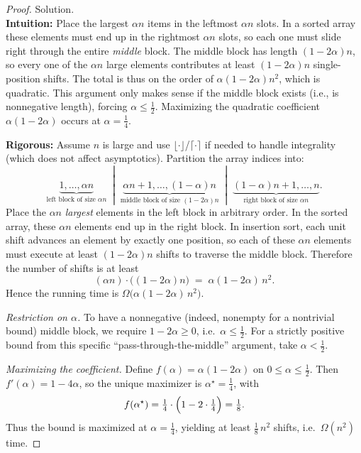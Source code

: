 \documentclass[12pt]{article}
\theoremstyle{definition}
\begin{document}
\begin{proof}
Solution. \\

\noindent
\textbf{Intuition:}  
Place the largest $\alpha n$ items in the leftmost $\alpha n$ slots. In a sorted array
these elements must end up in the rightmost $\alpha n$ slots, so each one must slide
right through the entire \emph{middle} block. The middle block has length
$(1-2\alpha)n$, so every one of the $\alpha n$ large elements contributes at least
$(1-2\alpha)n$ single-position shifts. The total is thus on the order of
$\alpha(1-2\alpha)n^2$, which is quadratic. This argument only makes sense if the
middle block exists (i.e., is nonnegative length), forcing $\alpha \le \tfrac12$.
Maximizing the quadratic coefficient $\alpha(1-2\alpha)$ occurs at $\alpha=\tfrac14$.

\noindent
\textbf{Rigorous:}  
Assume $n$ is large and use $\lfloor\cdot\rfloor$/$\lceil\cdot\rceil$ if needed to handle
integrality (which does not affect asymptotics). Partition the array indices into:
\[
\underbrace{1,\dots,\alpha n}_{\text{left block of size }\alpha n}\;\;|\;\;
\underbrace{\alpha n+1,\dots,(1-\alpha)n}_{\text{middle block of size }(1-2\alpha)n}\;\;|\;\;
\underbrace{(1-\alpha)n+1,\dots,n}_{\text{right block of size }\alpha n}.
\]
Place the $\alpha n$ \emph{largest} elements in the left block in arbitrary order. In
the sorted array, these $\alpha n$ elements end up in the right block. In insertion
sort, each unit shift advances an element by exactly one position, so each of these
$\alpha n$ elements must execute at least $(1-2\alpha)n$ shifts to traverse the middle
block. Therefore the number of shifts is at least
\[
(\alpha n)\cdot\bigl((1-2\alpha)n\bigr) \;=\; \alpha(1-2\alpha)\,n^2.
\]
Hence the running time is $\Omega\!\bigl(\alpha(1-2\alpha)\,n^2\bigr)$.

\emph{Restriction on $\alpha$.}  
To have a nonnegative (indeed, nonempty for a nontrivial bound) middle block, we
require $1-2\alpha \ge 0$, i.e.\ $\alpha \le \tfrac12$. For a strictly positive bound from
this specific “pass-through-the-middle” argument, take $\alpha<\tfrac12$.

\emph{Maximizing the coefficient.}  
Define $f(\alpha)=\alpha(1-2\alpha)$ on $0\le\alpha\le\tfrac12$. Then
$f'(\alpha)=1-4\alpha$, so the unique maximizer is $\alpha^\star=\tfrac14$, with
\[
f(\alpha^\star)=\tfrac14\cdot\Bigl(1-2\cdot\tfrac14\Bigr)=\tfrac18.
\]
Thus the bound is maximized at $\alpha=\tfrac14$, yielding at least
$\tfrac18\,n^2$ shifts, i.e.\ $\Omega(n^2)$ time.
\end{proof}
\end{document}
